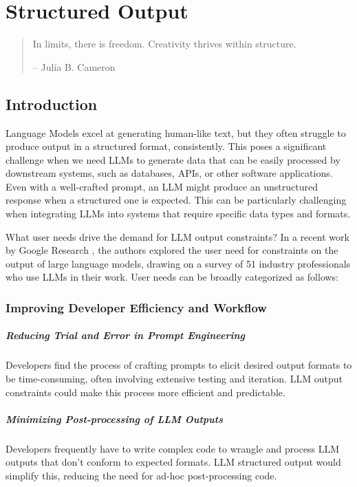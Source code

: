 \chapter{Structured Output}

\begin{quote}
In limits, there is freedom. Creativity thrives within structure.

\raggedleft -- Julia B. Cameron
\end{quote}

\tableofcontents

\section{Introduction}

Language Models excel at generating human-like text, but they often struggle to produce output in a structured format, consistently. This poses a significant challenge when we need LLMs to generate data that can be easily processed by downstream systems, such as databases, APIs, or other software applications. Even with a well-crafted prompt, an LLM might produce an unstructured response when a structured one is expected. This can be particularly challenging when integrating LLMs into systems that require specific data types and formats.

What user needs drive the demand for LLM output constraints? In a recent work by Google Research \cite{10.1145/3613905.3650756}, the authors explored the user need for constraints on the output of large language models, drawing on a survey of 51 industry professionals who use LLMs in their work. User needs can be broadly categorized as follows:
\subsection{Improving Developer Efficiency and Workflow}

\paragraph{Reducing Trial and Error in Prompt Engineering}
Developers find the process of crafting prompts to elicit desired output formats to be time-consuming, often involving extensive testing and iteration. LLM output constraints could make this process more efficient and predictable.

\paragraph{Minimizing Post-processing of LLM Outputs}
Developers frequently have to write complex code to wrangle and process LLM outputs that don't conform to expected formats. LLM structured output would simplify this, reducing the need for ad-hoc post-processing code.

